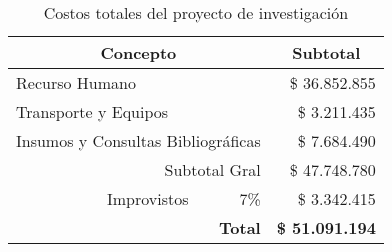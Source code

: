 \begin{table}[H]
\centering
 \setlength{\tabcolsep}{2pt}

	\begin{tabular}{lccr}
	\toprule
		\multicolumn{3}{c}{\textbf{Concepto}} 	& \multicolumn{1}{c}{\textbf{Subtotal}}\\
		\hline
		\multicolumn{3}{l}{Recurso Humano} 								& \$ 36.852.855\\
		\multicolumn{3}{l}{Transporte y Equipos} 						& \$ 3.211.435\\
		\multicolumn{3}{l}{Insumos y Consultas Bibliográficas}			& \$ 7.684.490\\
		\hline
		\multicolumn{3}{r}{Subtotal Gral} 								& \$ 47.748.780\\
		\multicolumn{2}{r}{Improvistos}	&\multicolumn{1}{r}{7\%}		& \$ 3.342.415\\
		
		\multicolumn{3}{r}{\textbf{Total}} 	& \multicolumn{1}{c}{\textbf{\$ 51.091.194}}\\
	\bottomrule
	\end{tabular}

\caption{Costos totales del proyecto de investigación}
\label{Tabla3}

\end{table}
